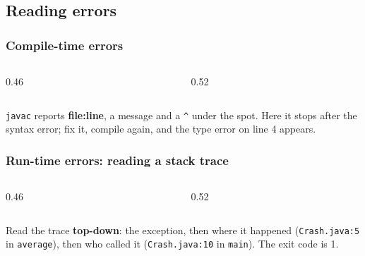 \documentclass[aspectratio=169,10pt,compress]{beamer}
\begin{document}

\subsection[Errors]{Reading errors}




\begin{frame}[t,fragile] \frametitle{Compile-time errors}
  \begin{columns}[T]
    \begin{column}{0.46\textwidth}
    \end{column}
    \begin{column}{0.52\textwidth}
    \end{column}
  \end{columns}

  \vspace{0.1em}
  \small \texttt{javac} reports \textbf{file:line}, a message and a \texttt{\^{}} under the spot. Here it stops after the
  syntax error; fix it, compile again, and the type error on line 4 appears.
\end{frame}




\begin{frame}[t,fragile] \frametitle{Run-time errors: reading a stack trace}
  \begin{columns}[T]
    \begin{column}{0.46\textwidth}
    \end{column}
    \begin{column}{0.52\textwidth}
    \end{column}
  \end{columns}

  \vspace{0.1em}
  \small Read the trace \textbf{top-down}: the exception, then where it happened (\texttt{Crash.java:5} in \texttt{average}),
  then who called it (\texttt{Crash.java:10} in \texttt{main}). The exit code is 1.
\end{frame}
\end{document}

